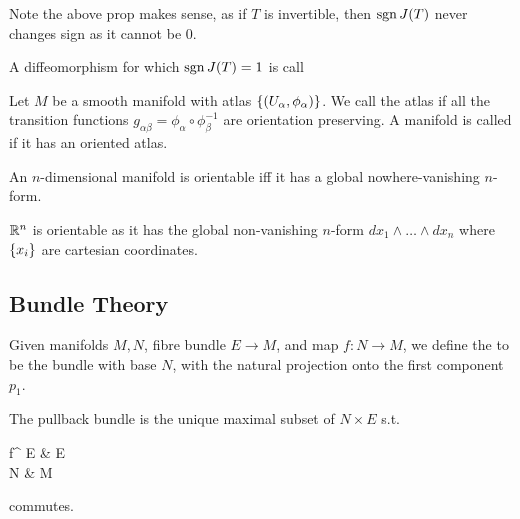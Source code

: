 \documentclass{article}
\begin{document}
\begin{remark}
	Note the above prop makes sense, as if $T$ is invertible, then $\operatorname{sgn} J(T)$ never changes sign as it cannot be 0. 
\end{remark}

\begin{definition}
	A diffeomorphism for which $\operatorname{sgn} J(T)=1$ is call 
\end{definition}

\begin{definition}
	Let $M$ be a smooth manifold with atlas $\left\{ (U_\alpha,\phi_\alpha) \right\}$. We call the atlas  if all the transition functions $g_{\alpha\beta}=\phi_\alpha \circ \phi_\beta^{-1}$ are orientation preserving. A manifold is called  if it has an oriented atlas. 
\end{definition}

\begin{prop}
	An $n$-dimensional manifold is orientable iff it has a global nowhere-vanishing $n$-form. 
\end{prop}

\begin{example}
	$\mathbb{R}^n$ is orientable as it has the global non-vanishing $n$-form $dx_1 \wedge \dots \wedge dx_n$ where $\left\{ x_i \right\}$ are cartesian coordinates.  
\end{example}

\subsection{Bundle Theory}



\begin{definition}
	Given manifolds $M,N$, fibre bundle $E \to M$, and map $f:N \to M$, we define the  to be 
the bundle with base $N$, with the natural projection onto the first component $p_1$. 
\end{definition}

\begin{lemma}
The pullback bundle is the unique maximal subset of $N \times E$ s.t. 
\begin{tkz}
	f^{\ast} E \arrow[r,"p_2"] \arrow[d,"p_1"'] & E \arrow[d,"\pi"] \\
	N \arrow[r,"f"'] & M
\end{tkz} 
commutes.
\end{lemma}
\end{document}
